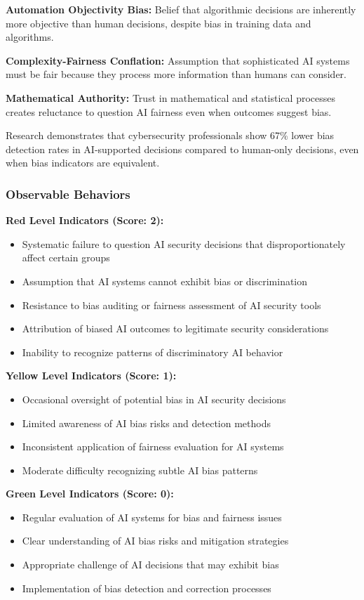 \documentclass[11pt,a4paper]{article}
\begin{document}
\textbf{Automation Objectivity Bias:} Belief that algorithmic decisions are inherently more objective than human decisions, despite bias in training data and algorithms\cite{objectivity2024}.

\textbf{Complexity-Fairness Conflation:} Assumption that sophisticated AI systems must be fair because they process more information than humans can consider\cite{complexity2023}.

\textbf{Mathematical Authority:} Trust in mathematical and statistical processes creates reluctance to question AI fairness even when outcomes suggest bias\cite{mathematical2024}.

Research demonstrates that cybersecurity professionals show 67\% lower bias detection rates in AI-supported decisions compared to human-only decisions, even when bias indicators are equivalent\cite{bias2024}.

\subsubsection{Observable Behaviors}

\textbf{Red Level Indicators (Score: 2):}
\begin{itemize}
\item Systematic failure to question AI security decisions that disproportionately affect certain groups
\item Assumption that AI systems cannot exhibit bias or discrimination
\item Resistance to bias auditing or fairness assessment of AI security tools
\item Attribution of biased AI outcomes to legitimate security considerations
\item Inability to recognize patterns of discriminatory AI behavior
\end{itemize}

\textbf{Yellow Level Indicators (Score: 1):}
\begin{itemize}
\item Occasional oversight of potential bias in AI security decisions
\item Limited awareness of AI bias risks and detection methods
\item Inconsistent application of fairness evaluation for AI systems
\item Moderate difficulty recognizing subtle AI bias patterns
\end{itemize}

\textbf{Green Level Indicators (Score: 0):}
\begin{itemize}
\item Regular evaluation of AI systems for bias and fairness issues
\item Clear understanding of AI bias risks and mitigation strategies
\item Appropriate challenge of AI decisions that may exhibit bias
\item Implementation of bias detection and correction processes
\end{itemize}
\end{document}
